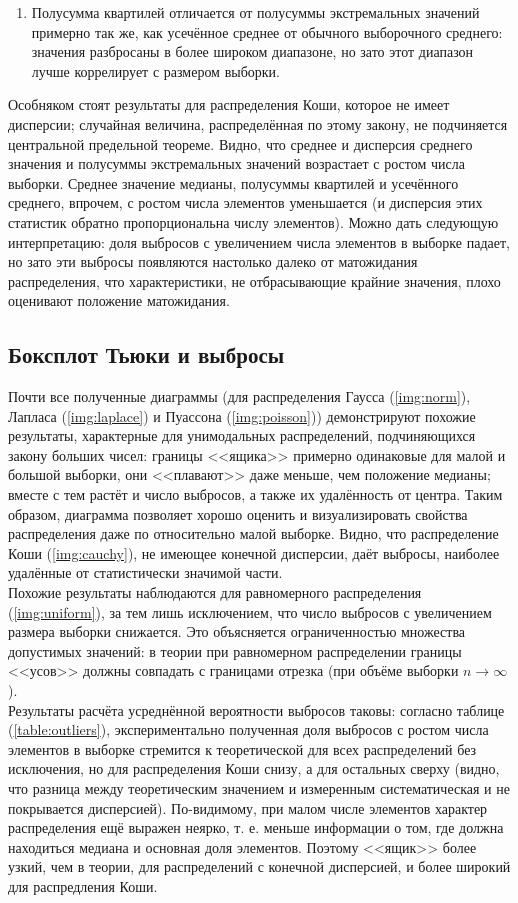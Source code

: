 \documentclass[zuev_report2.tex]{subfiles}
\begin{document}
\begin{enumerate}
	\item Полусумма квартилей отличается от полусуммы экстремальных значений примерно так же, как усечённое среднее от обычного выборочного среднего: значения разбросаны в более широком диапазоне, но зато этот диапазон лучше коррелирует с размером выборки.
\end{enumerate}
Особняком стоят результаты для распределения Коши, которое не имеет дисперсии; случайная величина, распределённая по этому закону, не подчиняется центральной предельной теореме. Видно, что среднее и дисперсия среднего значения и полусуммы экстремальных значений возрастает с ростом числа выборки. Среднее значение медианы, полусуммы квартилей и усечённого среднего, впрочем,  с ростом числа элементов уменьшается (и дисперсия этих статистик обратно пропорциональна числу элементов). Можно дать следующую интерпретацию: доля выбросов с увеличением числа элементов в выборке падает, но зато эти выбросы появляются настолько далеко от матожидания распределения, что характеристики, не отбрасывающие крайние значения, плохо оценивают положение матожидания.

\subsection{Боксплот Тьюки и выбросы}
Почти все полученные диаграммы (для распределения Гаусса (\ref{img:norm}), Лапласа (\ref{img:laplace}) и Пуассона (\ref{img:poisson})) демонстрируют похожие результаты, характерные для унимодальных распределений, подчиняющихся закону больших чисел: границы <<ящика>> примерно одинаковые для малой и большой выборки, они <<плавают>> даже меньше, чем положение медианы; вместе с тем растёт и число выбросов, а также их удалённость от центра. Таким образом, диаграмма позволяет хорошо оценить и визуализировать свойства распределения даже по относительно малой выборке.  Видно, что распределение Коши (\ref{img:cauchy}), не имеющее конечной дисперсии, даёт выбросы, наиболее удалённые от статистически значимой части.\\
Похожие результаты наблюдаются для равномерного распределения (\ref{img:uniform}), за тем лишь исключением, что число выбросов с увеличением размера выборки снижается. Это объясняется ограниченностью множества допустимых значений: в теории при равномерном распределении границы <<усов>> должны совпадать с границами отрезка (при объёме выборки $n \rightarrow \infty$).\\
Результаты расчёта усреднённой вероятности выбросов таковы: согласно таблице (\ref{table:outliers}), экспериментально полученная доля выбросов с ростом числа элементов в выборке стремится к теоретической для всех распределений без исключения, но для распределения Коши снизу, а для остальных сверху (видно, что разница между теоретическим значением и измеренным систематическая и не покрывается дисперсией). По-видимому, при малом числе элементов характер распределения ещё выражен неярко, т. е. меньше информации о том, где должна находиться медиана и основная доля элементов. Поэтому <<ящик>> более узкий, чем в теории, для распределений с конечной дисперсией, и более широкий для распредления Коши.\\  
\end{document}
